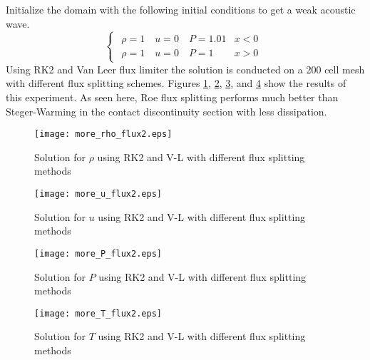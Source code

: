 \documentclass{article}
\begin{document}
Initialize the domain with the following initial conditions to get a weak acoustic wave.
\begin{equation*}
\begin{cases}
\begin{matrix}
\rho=1 \quad u=0 \quad P=1.01 & x<0 \\
\rho=1 \quad u=0 \quad P=1 & x>0
\end{matrix}
\end{cases}
\end{equation*}
Using RK2 and Van Leer flux limiter the solution is conducted on a 200 cell mesh with different flux splitting schemes. Figures \ref{fig_more_rho_flux2}, \ref{fig_more_u_flux2}, \ref{fig_more_P_flux2}, and \ref{fig_more_T_flux2} show the results of this experiment. As seen here, Roe flux splitting performs much better than Steger-Warming in the contact discontinuity section with less dissipation.

\begin{figure}[H]
\centering
\texttt{[image: more\_rho\_flux2.eps]}
\caption{Solution for $\rho$ using RK2 and V-L with different flux splitting methods}
\label{fig_more_rho_flux2}
\end{figure}

\begin{figure}[H]
\centering
\texttt{[image: more\_u\_flux2.eps]}
\caption{Solution for $u$ using RK2 and V-L with different flux splitting methods}
\label{fig_more_u_flux2}
\end{figure}

\begin{figure}[H]
\centering
\texttt{[image: more\_P\_flux2.eps]}
\caption{Solution for $P$ using RK2 and V-L with different flux splitting methods}
\label{fig_more_P_flux2}
\end{figure}

\begin{figure}[H]
\centering
\texttt{[image: more\_T\_flux2.eps]}
\caption{Solution for $T$ using RK2 and V-L with different flux splitting methods}
\label{fig_more_T_flux2}
\end{figure}












\newpage


\end{document}
